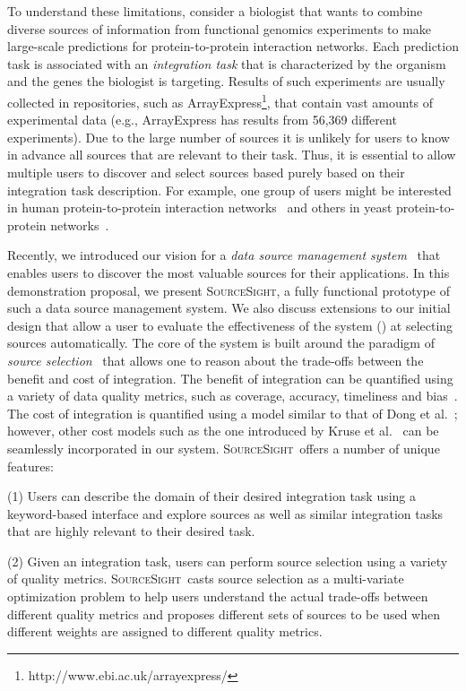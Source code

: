 \documentclass{vldb}
\newcommand\system{\textsc{SourceSight}}
\begin{document}
To understand these limitations, consider a biologist that wants to combine diverse sources of information from functional genomics experiments to make large-scale predictions for protein-to-protein interaction networks. Each prediction task is associated with an {\em integration task} that is characterized by the organism and the genes the biologist is targeting. Results of such experiments are usually collected in repositories, such as ArrayExpress\footnote{http://www.ebi.ac.uk/arrayexpress/}, that contain vast amounts of experimental data (e.g., ArrayExpress has results from 56,369 different experiments). Due to the large number of sources it is unlikely for users to know in advance all sources that are relevant to their task. Thus, it is essential to allow multiple users to discover and select sources based purely based on their integration task description. For example, one group of users might be interested in human protein-to-protein interaction networks~\cite{humanpp} and others in yeast protein-to-protein networks~\cite{yeastpp}.

Recently, we introduced our vision for a {\em data source management system}~\cite{rekatsinas:2015} that enables users to discover the most valuable sources for their applications. In this demonstration proposal, we present \system, a fully functional prototype of such a data source management system. We also discuss extensions to our initial design that allow a user to evaluate the effectiveness of the system () at selecting sources automatically. The core of the system is built around the paradigm of {\em source selection}~\cite{dong:vldb13} that allows one to reason about the trade-offs between the benefit and cost of integration. The benefit of integration can be quantified using a variety of data quality metrics, such as coverage, accuracy, timeliness and bias~\cite{rekatsinas:2015}. The cost of integration is quantified using a model similar to that of Dong et al.~\cite{dong:vldb13}; however, other cost models such as the one introduced by Kruse et al.~\cite{kruse2015estimating} can be seamlessly incorporated in our system. \system~offers a number of unique features:

\vspace{2pt}\noindent (1) Users can describe the domain of their desired integration task using a keyword-based interface and explore sources as well as similar integration tasks that are highly relevant to their desired task.

\vspace{2pt}\noindent (2) Given an integration task, users can perform source selection using a variety of quality metrics. \system~casts source selection as a multi-variate optimization problem to help users understand the actual trade-offs between different quality metrics and proposes different sets of sources to be used when different weights are assigned to different quality metrics. 
\end{document}
